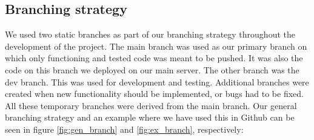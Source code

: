 \renewcommand{\arraystretch}{2}
\begin{table}[H]
    \centering
    \caption{Repository folders}
    \label{tab:repo_folders}
    \end{table}

\subsection{Branching strategy}
We used two static branches as part of our branching strategy throughout the development of the project. 
The main branch was used as our primary branch on which only functioning and tested code was meant to be pushed. It was
also the code on this branch we deployed on our main server. The other branch was the dev branch. This was used for 
development and testing. Additional branches were created when new functionality should be implemented, or bugs had to be
fixed. All these temporary branches were derived from the main branch. Our general branching strategy and an example where
we have used this in Github can be seen in figure \ref{fig:gen_branch} and \ref{fig:ex_branch}, respectively:


